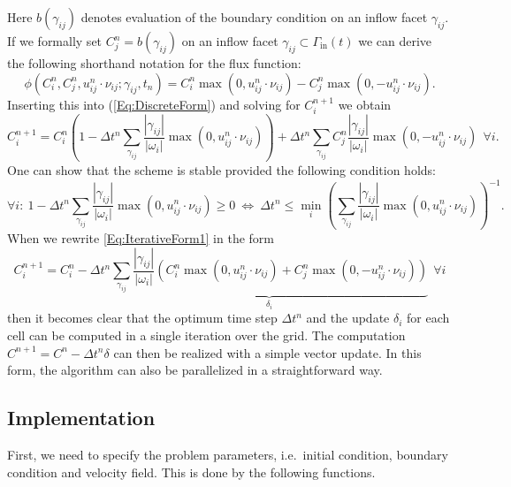 \documentclass[11pt,a4paper,headinclude,footinclude,DIV16,headings=normal]{scrreprt}
\begin{document}
Here $b(\gamma_{ij})$ denotes evaluation of the boundary condition on
an inflow facet $\gamma_{ij}$. If we formally set
$C_j^n=b(\gamma_{ij})$ on an inflow facet $\gamma_{ij} \subset
\Gamma_{\text{in}}(t)$ we can derive the following shorthand notation
for the flux function:
\begin{equation}
\phi(C_i^n, C_j^n, u_{ij}^n\cdot\nu_{ij}; \gamma_{ij}, t_n ) = C_i^n
\max(0,u_{ij}^n\cdot\nu_{ij}) - C_j^n \max(0,-u_{ij}^n\cdot\nu_{ij}).
\end{equation}
Inserting this into (\ref{Eq:DiscreteForm}) and solving for
$C_i^{n+1}$ we obtain
\begin{equation}
C_i^{n+1} = C_i^n\left(1-\Delta t^n \sum\limits_{\gamma_{ij}}
  \frac{|\gamma_{ij}|}{|\omega_i|}
  \max(0,u_{ij}^n\cdot\nu_{ij})\right) + \Delta t^n
\sum\limits_{\gamma_{ij}} C_j^n  \frac{|\gamma_{ij}|}{|\omega_i|}
\max(0,-u_{ij}^n\cdot\nu_{ij}) \ \ \forall i.
\label{Eq:IterativeForm1}
\end{equation}
One can show that the scheme is stable provided the following condition holds:
\begin{equation}
\forall i:\ 1-\Delta t^n \sum\limits_{\gamma_{ij}}
  \frac{|\gamma_{ij}|}{|\omega_i|}
  \max(0,u_{ij}^n\cdot\nu_{ij})\geq 0 \ \Leftrightarrow\ \Delta
  t^n\leq  \min_i \left(\sum\limits_{\gamma_{ij}}
  \frac{|\gamma_{ij}|}{|\omega_i|}
  \max(0,u_{ij}^n\cdot\nu_{ij})\right)^{-1}.
\label{Eq:TimeStepControl}
\end{equation}
When we rewrite \ref{Eq:IterativeForm1} in the form
\begin{equation}
C_i^{n+1} = C_i^n - \Delta t^n
  \underbrace{\sum\limits_{\gamma_{ij}} \frac{|\gamma_{ij}|}{|\omega_i|}
  \left( C_i^n \max(0,u_{ij}^n\cdot\nu_{ij}) +
         C_j^n \max(0,-u_{ij}^n\cdot\nu_{ij})\right)}_{\delta_i} \ \ \forall i
\label{Eq:IterativeForm2}
\end{equation}
then it becomes clear that the optimum time step $\Delta t^n$ and the
update $\delta_i$ for each cell can be computed in a single iteration
over the grid. The computation $C^{n+1} = C^n - \Delta t^n \delta$ can then
be realized with a simple vector update. In this form, the algorithm
can also be parallelized in a straightforward way.


\subsection{Implementation}

First, we need to specify the problem parameters, i.e.~initial
condition, boundary condition and velocity field. This is done by the
following functions.
\end{document}
